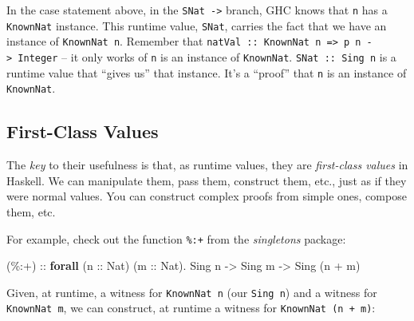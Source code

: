 \documentclass[]{article}
\newenvironment{Shaded}{}{}
\newcommand{\CommentTok}[1]{\textcolor[rgb]{0.38,0.63,0.69}{\textit{#1}}}
\newcommand{\DataTypeTok}[1]{\textcolor[rgb]{0.56,0.13,0.00}{#1}}
\newcommand{\KeywordTok}[1]{\textcolor[rgb]{0.00,0.44,0.13}{\textbf{#1}}}
\newcommand{\NormalTok}[1]{#1}
\newcommand{\OperatorTok}[1]{\textcolor[rgb]{0.40,0.40,0.40}{#1}}
\newcommand{\OtherTok}[1]{\textcolor[rgb]{0.00,0.44,0.13}{#1}}
\begin{document}
In the case statement above, in the \texttt{SNat\ -\textgreater{}} branch, GHC
knows that \texttt{n} has a \texttt{KnownNat} instance. This runtime value,
\texttt{SNat}, carries the fact that we have an instance of
\texttt{KnownNat\ n}. Remember that
\texttt{natVal\ ::\ KnownNat\ n\ =\textgreater{}\ p\ n\ -\textgreater{}\ Integer}
-- it only works of \texttt{n} is an instance of \texttt{KnownNat}.
\texttt{SNat\ ::\ Sing\ n} is a runtime value that ``gives us'' that instance.
It's a ``proof'' that \texttt{n} is an instance of \texttt{KnownNat}.

\hypertarget{first-class-values}{%
\subsection{First-Class Values}\label{first-class-values}}

The \emph{key} to their usefulness is that, as runtime values, they are
\emph{first-class values} in Haskell. We can manipulate them, pass them,
construct them, etc., just as if they were normal values. You can construct
complex proofs from simple ones, compose them, etc.

For example, check out the function \texttt{\%:+} from the \emph{singletons}
package:

\begin{Shaded}
\begin{Highlighting}[]
\OtherTok{(\%:+) ::} \KeywordTok{forall}\NormalTok{ (}\OtherTok{n ::} \DataTypeTok{Nat}\NormalTok{) (}\OtherTok{m ::} \DataTypeTok{Nat}\NormalTok{)}\OperatorTok{.} \DataTypeTok{Sing}\NormalTok{ n }\OtherTok{{-}>} \DataTypeTok{Sing}\NormalTok{ m }\OtherTok{{-}>} \DataTypeTok{Sing}\NormalTok{ (n }\OperatorTok{+}\NormalTok{ m)}
\end{Highlighting}
\end{Shaded}

Given, at runtime, a witness for \texttt{KnownNat\ n} (our \texttt{Sing\ n}) and
a witness for \texttt{KnownNat\ m}, we can construct, at runtime a witness for
\texttt{KnownNat\ (n\ +\ m)}:

\begin{Shaded}
\end{Shaded}
\end{document}
